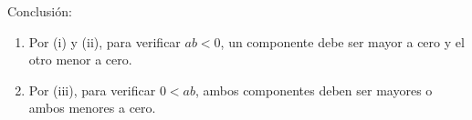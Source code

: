 \documentclass[11pt]{article}
\begin{document}
\begin{enumerate}[label=\alph*)]
    Conclusión:
    \begin{enumerate}[label=\arabic*)]
        \item Por (i) y (ii), para verificar $ab<0$, un componente debe ser mayor a cero y el otro menor a cero.%
        \item Por (iii), para verificar $0<ab$, ambos componentes deben ser mayores o ambos menores a cero.%
    \end{enumerate}
%

\end{enumerate}
\end{document}
